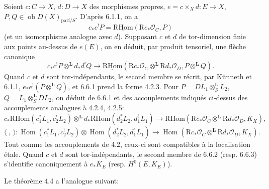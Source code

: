 \documentclass[11pt]{article}
\providecommand{\cO}{\mathcal{O}}
\DeclareMathOperator{\Hom}{Hom}
\newcommand{\R}{\mathrm{R}}\newcommand{\RHomCore}{\mathrm{RHom}}
\providecommand{\RHom}{\RHomCore}
\providecommand{\uRHom}{\underline{\RHom}}
\providecommand{\RHom}{\RHomCore}
\providecommand{\Hom}{\operatorname{Hom}}
\providecommand{\RHom}{\R\mathcal{H}om}
\providecommand{\R}{\mathrm R}
\providecommand{\RHom}{\RHomCore}
\providecommand{\Hom}{\operatorname{Hom}}
\begin{document}
Soient $c:C\to X$, $d:D\to X$ des morphismes propres, $e=c\times_Xd:E\to X$, $P,Q\in\operatorname{ob}D(X)_{\mathrm{parf}/S}$. D'après 6.1.1, on a
\[
c_*c^!P=\uRHom(\R c_*\cO_C,P)
\]
(et un isomorphisme analogue avec $d$). Supposant $c$ et $d$ de tor-dimension finie aux points au-dessus de $e(E)$, on en déduit, par produit tensoriel, une flèche canonique
\begin{equation}
\tag{6.6.1}
c_*c^!P\otimes^{\mathbf L}d_*d^!Q\longrightarrow
\uRHom(\R c_*\cO_C\otimes^{\mathbf L}\R d_*\cO_D,P\otimes^{\mathbf L}Q).
\end{equation}
Quand $c$ et $d$ sont tor-indépendants, le second membre se récrit, par Künneth et 6.1.1, $e_*e^!(P\otimes^{\mathbf L}Q)$, et 6.6.1 prend la forme 4.2.3. Pour $P=DL_1\otimes_S^{\mathbf L}L_2$, $Q=L_1\otimes_S^{\mathbf L}DL_2$, on déduit de 6.6.1 et des accouplements indiqués ci-dessus des accouplements analogues à 4.2.4, 4.2.5:
\begin{equation}
\tag{6.6.2}
c_*\uRHom(c_1^*L_1,c_2^!L_2)\otimes^{\mathbf L}d_*\uRHom(d_2^*L_2,d_1^!L_1)
\longrightarrow\uRHom(\R c_*\cO_C\otimes^{\mathbf L}\R d_*\cO_D,K_X),
\end{equation}
\begin{equation}
\tag{6.6.3}
\langle\ ,\ \rangle:\Hom(c_1^*L_1,c_2^!L_2)\otimes\Hom(d_2^*L_2,d_1^!L_1)
\longrightarrow\Hom(\R c_*\cO_C\otimes^{\mathbf L}\R d_*\cO_D,K_X).
\end{equation}
Tout comme les accouplements de 4.2, ceux-ci sont compatibles à la localisation étale. Quand $c$ et $d$ sont tor-indépendants, le second membre de 6.6.2 (resp. 6.6.3) s'identifie canoniquement à $e_*K_E$ (resp. $H^0(E,K_E)$).

Le théorème 4.4 a l'analogue suivant:
\end{document}
